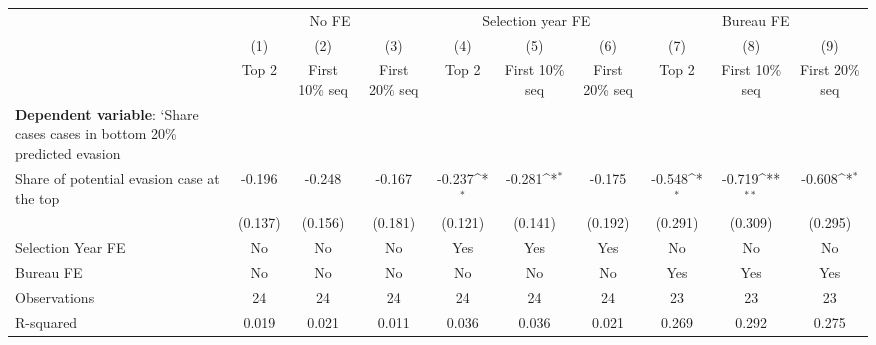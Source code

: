 {
\def\sym#1{\ifmmode^{#1}\else\(^{#1}\)\fi}
\begin{tabular}{l*{9}{c}}
\toprule
            &\multicolumn{3}{c}{No FE}                                        &\multicolumn{3}{c}{Selection year FE}                            &\multicolumn{3}{c}{Bureau FE}                                    \\\cmidrule(lr){2-4}\cmidrule(lr){5-7}\cmidrule(lr){8-10}
            &\multicolumn{1}{c}{(1)}&\multicolumn{1}{c}{(2)}&\multicolumn{1}{c}{(3)}&\multicolumn{1}{c}{(4)}&\multicolumn{1}{c}{(5)}&\multicolumn{1}{c}{(6)}&\multicolumn{1}{c}{(7)}&\multicolumn{1}{c}{(8)}&\multicolumn{1}{c}{(9)}\\
            &\multicolumn{1}{c}{Top 2}&\multicolumn{1}{c}{First 10\% seq}&\multicolumn{1}{c}{First 20\% seq}&\multicolumn{1}{c}{Top 2}&\multicolumn{1}{c}{First 10\% seq}&\multicolumn{1}{c}{First 20\% seq}&\multicolumn{1}{c}{Top 2}&\multicolumn{1}{c}{First 10\% seq}&\multicolumn{1}{c}{First 20\% seq}\\
\midrule
\textbf{Dependent variable}: `Share cases cases in bottom 20\% predicted evasion&                     &                     &                     &                     &                     &                     &                     &                     &                     \\
\addlinespace
Share of potential evasion case at the top&      -0.196         &      -0.248         &      -0.167         &      -0.237\sym{*}  &      -0.281\sym{*}  &      -0.175         &      -0.548\sym{*}  &      -0.719\sym{**} &      -0.608\sym{*}  \\
            &     (0.137)         &     (0.156)         &     (0.181)         &     (0.121)         &     (0.141)         &     (0.192)         &     (0.291)         &     (0.309)         &     (0.295)         \\
\midrule
Selection Year FE&          No         &          No         &          No         &         Yes         &         Yes         &         Yes         &          No         &          No         &          No         \\
Bureau FE   &          No         &          No         &          No         &          No         &          No         &          No         &         Yes         &         Yes         &         Yes         \\
Observations&          24         &          24         &          24         &          24         &          24         &          24         &          23         &          23         &          23         \\
R-squared   &       0.019         &       0.021         &       0.011         &       0.036         &       0.036         &       0.021         &       0.269         &       0.292         &       0.275         \\
\bottomrule
\end{tabular}
}

